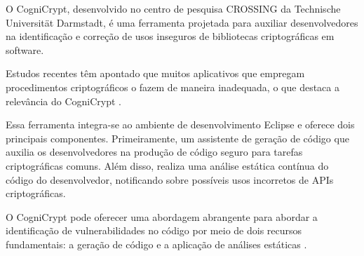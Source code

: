O CogniCrypt, desenvolvido no centro de pesquisa CROSSING da Technische Universität Darmstadt, é uma ferramenta projetada para auxiliar desenvolvedores na identificação e correção de usos inseguros de bibliotecas criptográficas em software. 

Estudos recentes têm apontado que muitos aplicativos que empregam procedimentos criptográficos o fazem de maneira inadequada, o que destaca a relevância do CogniCrypt \cite{CogniCrypt}.

Essa ferramenta integra-se ao ambiente de desenvolvimento Eclipse e oferece dois principais componentes. Primeiramente, um assistente de geração de código que auxilia os desenvolvedores na produção de código seguro para tarefas criptográficas comuns. Além disso, realiza uma análise estática contínua do código do desenvolvedor, notificando sobre possíveis usos incorretos de APIs criptográficas.




O CogniCrypt pode oferecer uma abordagem abrangente para abordar a identificação de vulnerabilidades no código por meio de dois recursos fundamentais: a geração de código e a aplicação de análises estáticas \cite{CogniCrypt}.


